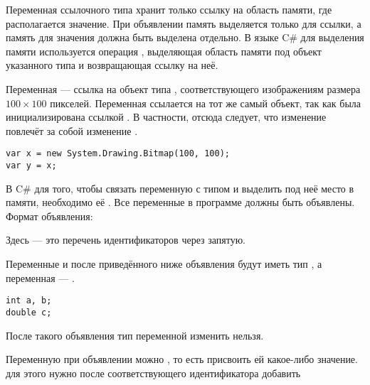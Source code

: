 Переменная ссылочного типа хранит только ссылку на область памяти, где
располагается значение. При объявлении память выделяется только для
ссылки, а память для значения должна быть выделена отдельно. В языке
C\# для выделения памяти используется операция ,
выделяющая область памяти под объект указанного типа и возвращающая
ссылку на неё.

\begin{example}
  Переменная  — ссылка на объект типа
  , соответствующего изображениям
  размера $100\times100$ пикселей.  Переменная  ссылается на
  тот же самый объект, так как была инициализирована ссылкой
  . В частности, отсюда следует, что изменение  повлечёт
  за собой изменение .

\begin{lstlisting}
var x = new System.Drawing.Bitmap(100, 100);
var y = x;
\end{lstlisting}
\end{example}


В C\# для того, чтобы связать переменную с типом и выделить под неё
место в памяти, необходимо её
. Все переменные в программе
должны быть объявлены. Формат объявления:

\begin{center}
  \par
\end{center}

Здесь  — это перечень
идентификаторов через запятую.

\begin{example}
  Переменные  и  после приведённого ниже
  объявления будут иметь тип , а переменная  —
  .

\begin{lstlisting}
int a, b;
double c;
\end{lstlisting}
\end{example}

После такого объявления тип переменной изменить нельзя.


Переменную при объявлении можно
, то есть присвоить ей
какое-либо значение. для этого нужно после соответствующего
идентификатора добавить

